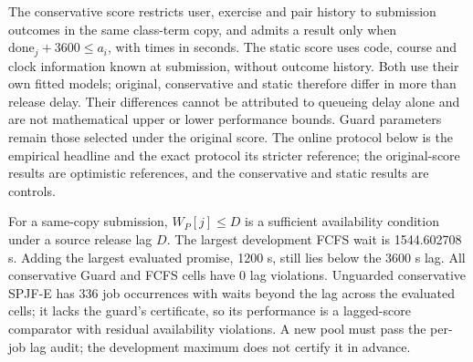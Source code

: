 \documentclass[mathematics,supfile,submit,moreauthors]{Definitions/mdpi}
\newcommand{\devnum}[1]{#1}
\begin{document}
The conservative score restricts user, exercise and pair history to submission
outcomes in the same class-term copy, and admits a result only when
$\mathrm{done}_j+\devnum{3600}\le a_i$, with times in seconds. The static score
uses code, course and clock information known at submission, without outcome
history. Both use their own fitted models; original, conservative and static
therefore differ in more than release delay. Their differences cannot be attributed
to queueing delay alone and are not mathematical upper or lower performance bounds.
Guard parameters remain those selected under the original score. The online protocol
below is the empirical headline and the exact protocol its stricter reference; the
original-score results are optimistic references, and the conservative and static
results are controls.

For a same-copy submission, $W_P[j]\le D$ is a sufficient availability condition
under a source release lag $D$. The largest development FCFS wait is
\devnum{1544.602708} s. Adding the largest evaluated promise, \devnum{1200} s,
still lies below the \devnum{3600} s lag. All conservative Guard and FCFS cells
have \devnum{0} lag violations. Unguarded conservative SPJF-E has
\devnum{336} job occurrences with waits beyond the lag across the evaluated cells;
it lacks the guard's certificate, so its performance is a lagged-score comparator
with residual availability violations. A new pool must pass the per-job lag audit;
the development maximum does not certify it in advance.
\end{document}
